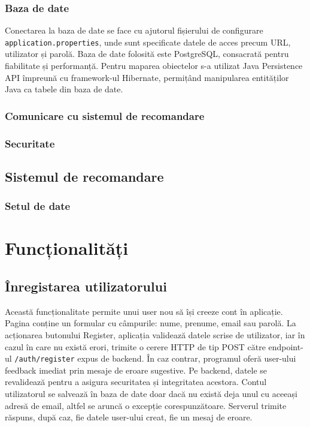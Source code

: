 \subsubsection*{Baza de date}
Conectarea la baza de date se face cu ajutorul fișierului de configurare \texttt{application.properties}, unde sunt specificate datele de acces precum URL, utilizator și parolă.
Baza de date folosită este PostgreSQL, consacrată pentru fiabilitate și performanță. Pentru maparea obiectelor s-a utilizat Java Persistence API împreună cu framework-ul Hibernate, permițând manipularea entităților Java ca tabele din baza de date.

\subsubsection*{Comunicare cu sistemul de recomandare}

\subsubsection*{Securitate}

\subsection{Sistemul de recomandare}
\label{subsec:ch4sec1sub3}
\subsubsection*{Setul de date}

\section{Funcționalități}
\label{sec:ch4sec2}


\subsection{Înregistarea utilizatorului}
\label{subsec:ch4sec2sub1}
Această funcționalitate permite unui user nou să își creeze cont în aplicație. Pagina conține un formular cu câmpurile: nume, prenume, email sau parolă.
La acționarea butonului Register, aplicația validează datele scrise de utilizator, iar în cazul în care
nu există erori, trimite o cerere HTTP de tip POST către endpoint-ul \texttt{/auth/register} expus de backend. În caz contrar, programul oferă user-ului feedback imediat prin mesaje de eroare sugestive.
Pe backend, datele se revalidează pentru a asigura securitatea și integritatea acestora. 
Contul utilizatorul se salvează în baza de date doar dacă nu există deja unul cu aceeași adresă de email, altfel se aruncă o excepție corespunzătoare.
Serverul trimite răspuns, după caz, fie datele user-ului creat, fie un mesaj de eroare.


